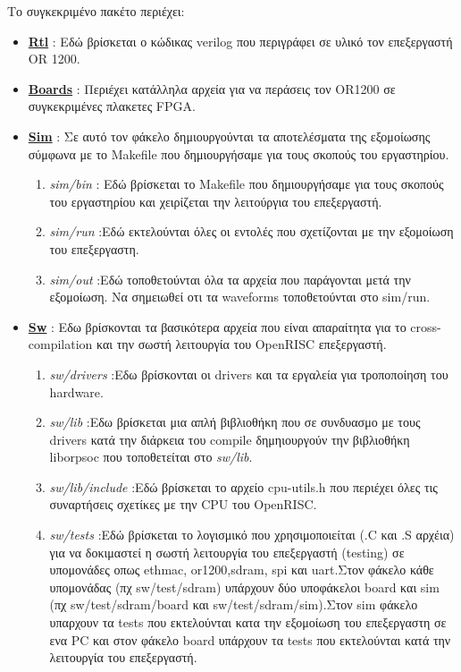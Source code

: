 \documentclass[a4paper,10pt]{article}
\numberwithin{figure}{subsection}
\numberwithin{table}{subsection}
\begin{document}
{{Το συγκεκριμένο πακέτο περιέχει:
\begin{itemize}
 \item \underline{{\bf Rtl}} : Εδώ βρίσκεται ο κώδικας verilog που περιγράφει σε υλικό τον επεξεργαστή OR 1200.
\item \underline{{\bf Boards}} : Περιέχει κατάλληλα αρχεία για να περάσεις τον OR1200 σε συγκεκριμένες πλακετες
FPGA.
\item \underline{{\bf Sim}} : Σε αυτό τον φάκελο δημιουργούνται τα αποτελέσματα της εξομοίωσης σύμφωνα με
το Makefile που δημιουργήσαμε για τους σκοπούς του εργαστηρίου. \begin{enumerate}
                                                                 \item \emph{sim/bin} : Εδώ βρίσκεται το Makefile που δημιουργήσαμε για τους σκοπούς του
εργαστηρίου και χειρίζεται την λειτούργια του επεξεργαστή.
                                                                 \item \emph{sim/run} :Εδώ εκτελούνται όλες οι εντολές που σχετίζονται με την εξομοίωση
του επεξεργαστη.
                                                                 \item \emph{sim/out} :Εδώ τοποθετούνται όλα τα αρχεία που παράγονται μετά την εξομοίωση.
Να σημειωθεί οτι τα waveforms τοποθετούνται στο sim/run.
                                                                \end{enumerate}

\item \underline{{\bf Sw}} : Εδω βρίσκονται τα βασικότερα αρχεία που είναι απαραίτητα για το cross-compilation 
και την σωστή λειτουργία του OpenRISC επεξεργαστή.
					  \begin{enumerate}
                                           \item \emph{sw/drivers} :Εδω βρίσκονται οι drivers και τα εργαλεία για τροποποίηση του hardware.
					   \item \emph{sw/lib} :Eδω βρίσκεται μια απλή βιβλιοθήκη που σε συνδυασμο με τους drivers κατά την διάρκεια του compile δημηιουργούν την βιβλιοθήκη liborpsoc 
που τοποθετείται στο \emph{sw/lib}.
					   \item \emph{sw/lib/include} :Εδώ βρίσκεται το αρχείο cpu-utils.h που περιέχει όλες τις συναρτήσεις σχετίκες
με την CPU του OpenRISC.
					   \item \emph{sw/tests} :Εδώ βρίσκεται το λογισμικό που χρησιμοποιείται (.C και .S αρχέια) για να δοκιμαστεί η σωστή λειτουργία
του επεξεργαστή (testing) σε υπομονάδες οπως ethmac, or1200,sdram, spi και uart.Στον φάκελο κάθε υπομονάδας (πχ sw/test/sdram) υπάρχουν δύο υποφάκελοι board 
και sim (πχ sw/test/sdram/board και sw/test/sdram/sim).Στον sim φάκελο υπαρχουν τα tests που εκτελούνται κατα την εξομοίωση του επεξεργαστη σε ενα PC και στον
φάκελο board υπάρχουν τα tests που εκτελούνται κατά την λειτουργία του επεξεργαστή.
                                          \end{enumerate}


\end{itemize}}}
\end{document}

